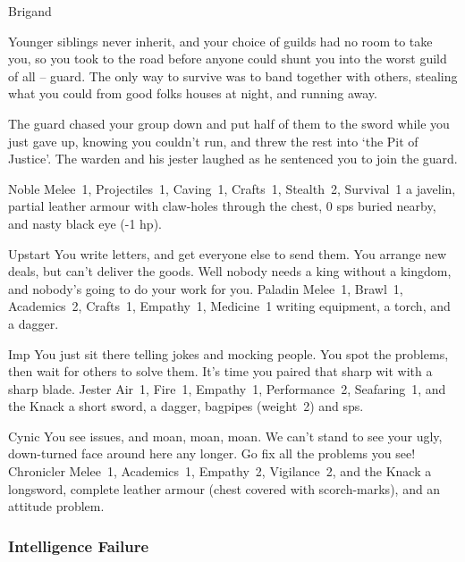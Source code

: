 \begin{multicols}{2}
\begin{itemize}
    {Brigand}%
    {
  Younger siblings never inherit, and your choice of guilds had no room to take you, so you took to the road before anyone could shunt you into the worst guild of all -- \gls{guard}.
  The only way to survive was to band together with others, stealing what you could from good folks houses at night, and running away.

  The \gls{guard} chased your group down and put half of them to the sword while you just gave up, knowing you couldn't run, and threw the rest into `the Pit of Justice'.
  The warden and his jester laughed as he sentenced you to join the \gls{guard}.
  }%
  {Noble}%
  {Melee~1, Projectiles~1, Caving~1, Crafts~1, Stealth~2, Survival~1}%
  {a javelin, partial leather armour with claw-holes through the chest, 0 \glspl{sp} buried nearby, and nasty black eye (-1 \gls{hp}).}%


  {Upstart}%
  {You write letters, and get everyone else to send them.
  You arrange new deals, but can't deliver the goods.
  Well nobody needs a king without a kingdom, and nobody's going to do your work for you.
  }%
  {Paladin}%
  {Melee~1, Brawl~1, Academics~2, Crafts~1, Empathy~1, Medicine~1}%
  {writing equipment, a torch, and a dagger.}%

  {Imp}%
  {You just sit there telling jokes and mocking people.
  You spot the problems, then wait for others to solve them.
  It's time you paired that sharp wit with a sharp blade.
  }%
  {Jester}%
  {Air~1, Fire~1, Empathy~1, Performance~2, Seafaring~1, and the Knack \snapcaster}%
  {a short sword, a dagger, bagpipes (\gls{weight}~2) and  \glspl{sp}.}%

  {Cynic}%
  {You see issues, and moan, moan, moan.
  We can't stand to see your ugly, down-turned face around here any longer.
  Go fix all the problems you see!
  }%
  {Chronicler}%
  {Melee~1, Academics~1, Empathy~2, Vigilance~2, and the Knack \adrenalinesurge}%
  {a longsword, complete leather armour (chest covered with scorch-marks), and an attitude problem.}%


\end{itemize}

\needspace{10em}
\subsubsection{Intelligence Failure}


\end{multicols}
